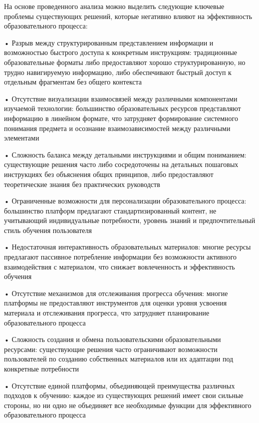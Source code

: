 {\gostFont
  
  \par \redline На основе проведенного анализа можно выделить следующие ключевые проблемы существующих решений, которые негативно влияют на эффективность образовательного процесса:
  
  \par \redline • Разрыв между структурированным представлением информации и возможностью быстрого доступа к конкретным инструкциям: традиционные образовательные форматы либо предоставляют хорошо структурированную, но трудно навигируемую информацию, либо обеспечивают быстрый доступ к отдельным фрагментам без общего контекста
  
  \par \redline • Отсутствие визуализации взаимосвязей между различными компонентами изучаемой технологии: большинство образовательных ресурсов представляют информацию в линейном формате, что затрудняет формирование системного понимания предмета и осознание взаимозависимостей между различными элементами
  
  \par \redline • Сложность баланса между детальными инструкциями и общим пониманием: существующие решения часто либо сосредоточены на детальных пошаговых инструкциях без объяснения общих принципов, либо предоставляют теоретические знания без практических руководств
  
  \par \redline • Ограниченные возможности для персонализации образовательного процесса: большинство платформ предлагают стандартизированный контент, не учитывающий индивидуальные потребности, уровень знаний и предпочтительный стиль обучения пользователя
  
  \par \redline • Недостаточная интерактивность образовательных материалов: многие ресурсы предлагают пассивное потребление информации без возможности активного взаимодействия с материалом, что снижает вовлеченность и эффективность обучения
  
  \par \redline • Отсутствие механизмов для отслеживания прогресса обучения: многие платформы не предоставляют инструментов для оценки уровня усвоения материала и отслеживания прогресса, что затрудняет планирование образовательного процесса
  
  \par \redline • Сложность создания и обмена пользовательскими образовательными ресурсами: существующие решения часто ограничивают возможности пользователей по созданию собственных материалов или их адаптации под конкретные потребности
  
  \par \redline • Отсутствие единой платформы, объединяющей преимущества различных подходов к обучению: каждое из существующих решений имеет свои сильные стороны, но ни одно не объединяет все необходимые функции для эффективного образовательного процесса

  \par
}

